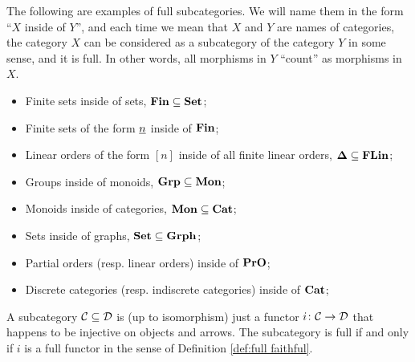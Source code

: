 \begin{example}

The following are examples of full subcategories. We will name them in the form “$X$ inside of $Y$”, and each time we mean that $X$ and $Y$ are names of categories, the category $X$ can be considered as a subcategory of the category $Y$ in some sense, and it is full. In other words, all morphisms in $Y$ “count” as morphisms in $X$.
\begin{itemize}
\item Finite sets inside of sets, ${\bf Fin}\subseteq{\bf Set}$;
\item Finite sets of the form $\underline{n}$ inside of ${\bf Fin}$;
\item Linear orders of the form $[n]$ inside of all finite linear orders, ${\bf \Delta}\subseteq{\bf FLin}$;
\item Groups inside of monoids, ${\bf Grp}\subseteq{\bf Mon}$;
\item Monoids inside of categories, ${\bf Mon}\subseteq{\bf Cat}$;
\item Sets inside of graphs, ${\bf Set}\subseteq{\bf Grph}$;
\item Partial orders (resp. linear orders) inside of ${\bf PrO}$;
\item Discrete categories (resp. indiscrete categories) inside of ${\bf Cat}$;
\end{itemize}

\end{example}

\begin{remark}

A subcategory $\mathcal{C}\subseteq\mathcal{D}$ is (up to isomorphism) just a functor $i\colon\mathcal{C}\rightarrow\mathcal{D}$ that happens to be injective on objects and arrows. The subcategory is full if and only if $i$ is a full functor in the sense of Definition \ref{def:full faithful}.

\end{remark}

%
%

